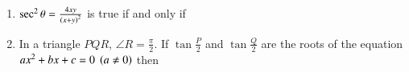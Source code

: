 \documentclass[journal,12pt,twocolumn]{IEEEtran}
\theoremstyle{remark}
\begin{document}
\begin{enumerate}
        \hfill{}
        \begin{enumerate}

        \end{enumerate}

    \item $\sec^2{\theta} = \frac{4xy}{\left(x+y\right)^2}$ is true if and only if
        
        \hfill{}
        \begin{enumerate}

        \end{enumerate}
        
\item In a triangle $PQR$, $\angle R = \frac{\pi}{2}$. If $\tan{\frac{P}{2}}$ and $\tan{\frac{Q}{2}}$ are the roots of the equation $ax^2+bx+c=0 \;\left(a\neq0\right)$ then
        
        \hfill{}
        \begin{enumerate}
\end{enumerate}
\end{enumerate}
\end{document}
